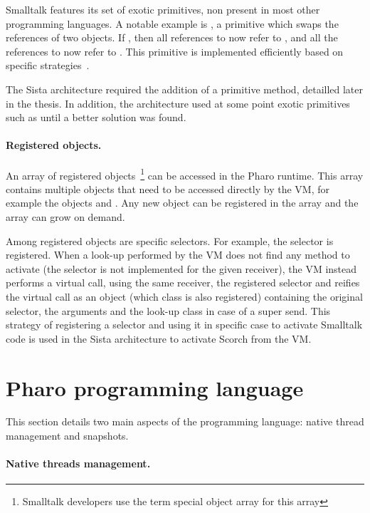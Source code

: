 \documentclass[a4paper,12pt,twoside]{../includes/ThesisStyle}
\begin{document}
Smalltalk features its set of exotic primitives, non present in most other programming languages. A notable example is , a primitive which swaps the references of two objects. If , then all references to  now refer to , and all the references to  now refer to . This primitive is implemented efficiently based on specific strategies~\cite{Mir15a}.

The Sista architecture required the addition of a primitive method, detailled later in the thesis. In addition, the architecture used at some point exotic primitives such as  until a better solution was found.

\paragraph{Registered objects.} An array of registered objects~\footnote{Smalltalk developers use the term special object array for this array} can be accessed in the Pharo runtime. This array contains multiple objects that need to be accessed directly by the VM, for example the objects  and . Any new object can be registered in the array and the array can grow on demand.

Among registered objects are specific selectors. For example, the  selector is registered. When a look-up performed by the VM does not find any method to activate (the selector is not implemented for the given receiver), the VM instead performs a virtual call, using the same receiver, the registered  selector and reifies the virtual call as an object (which class is also registered) containing the original selector, the arguments and the look-up class in case of a super send. This strategy of registering a selector and using it in specific case to activate Smalltalk code is used in the Sista architecture to activate Scorch from the VM.


\section{Pharo programming language}

This section details two main aspects of the programming language: native thread management and snapshots.

\paragraph{Native threads management.}
\end{document}
